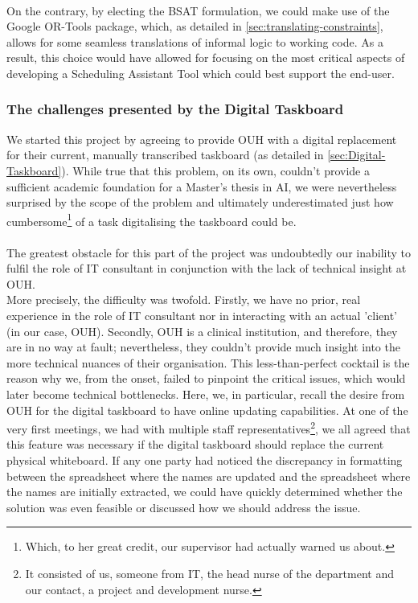 \\
On the contrary, by electing the BSAT formulation, we could make use of the Google OR-Tools package, which, as detailed in \autoref{sec:translating-constraints}, allows for some seamless translations of informal logic to working code. As a result, this choice would have allowed for focusing on the most critical aspects of developing a Scheduling Assistant Tool which could best support the end-user.

\subsubsection*{The challenges presented by the Digital Taskboard}
We started this project by agreeing to provide OUH with a digital replacement for their current, manually transcribed taskboard (as detailed in \autoref{sec:Digital-Taskboard}). While true that this problem, on its own, couldn't provide a sufficient academic foundation for a Master's thesis in AI, we were nevertheless surprised by the scope of the problem and ultimately underestimated just how cumbersome\footnote{Which, to her great credit, our supervisor had actually warned us about.} of a task digitalising the taskboard could be.
\\
\\
The greatest obstacle for this part of the project was undoubtedly our inability to fulfil the role of IT consultant in conjunction with the lack of technical insight at OUH.
\\
More precisely, the difficulty was twofold. Firstly, we have no prior, real experience in the role of IT consultant nor in interacting with an actual 'client' (in our case, OUH). Secondly, OUH is a clinical institution, and therefore, they are in no way at fault; nevertheless, they couldn't provide much insight into the more technical nuances of their organisation. This less-than-perfect cocktail is the reason why we, from the onset, failed to pinpoint the critical issues, which would later become technical bottlenecks. Here, we, in particular, recall the desire from OUH for the digital taskboard to have online updating capabilities. At one of the very first meetings, we had with multiple staff representatives\footnote{It consisted of us, someone from IT, the head nurse of the department and our contact, a project and development nurse.}, we all agreed that this feature was necessary if the digital taskboard should replace the current physical whiteboard. If any one party had noticed the discrepancy in formatting between the spreadsheet where the names are updated and the spreadsheet where the names are initially extracted, we could have quickly determined whether the solution was even feasible or discussed how we should address the issue.
